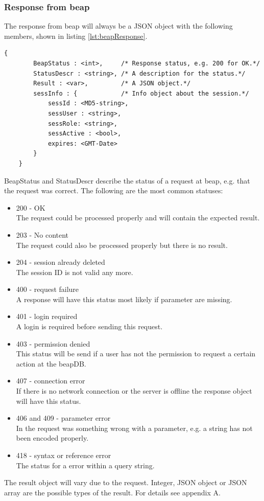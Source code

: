 \documentclass[12pt,a4paper,oneside]{report}
\begin{document}
\subsubsection{Response from beap}
The response from beap will always be a JSON object with the following members, shown in listing \ref{lst:beapResponse}. 
\lstset{language=JavaScript}
\begin{lstlisting}[caption=JSON object for beap response, label=lst:beapResponse]
{
		BeapStatus : <int>, 	/* Response status, e.g. 200 for OK.*/
		StatusDescr : <string>, /* A description for the status.*/
		Result : <var>,         /* A JSON object.*/
		sessInfo : {			/* Info object about the session.*/
			sessId : <MD5-string>,
			sessUser : <string>,
			sessRole: <string>,
			sessActive : <bool>,
			expires: <GMT-Date>  
		}
	}
\end{lstlisting}
\lstset{language=java}
BeapStatus and StatusDescr describe the status of a request at beap, e.g. that the request was correct. The following are the most common statuses:
\begin{itemize}
\item{200 - OK}
\\The request could be processed properly and will contain the expected result.
\item{203 - No content}
\\The request could also be processed properly but there is no result.
\item{204 - session already deleted}
\\The session ID is not valid any more.
\item{400 - request failure}
\\A response will have this status most likely if parameter are missing.
\item{401 - login required}
\\A login is required before sending this request.
\item{403 - permission denied}
\\This status will be send if a user has not the permission to request a certain action at the beapDB.
\item{407 - connection error}
\\If there is no network connection or the server is offline the response object will have this status.
\item{406 and 409 - parameter error}
\\In the request was something wrong with a parameter, e.g. a string has not been encoded properly.
\item{418 - syntax or reference error}
\\The status for a error within a query string.
\end{itemize}
The result object will vary due to the request. Integer, JSON object or JSON array are the possible types of the result. 
For details see appendix A.
\end{document}
